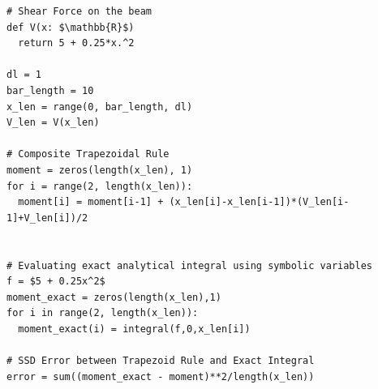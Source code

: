 \documentclass[border=10pt]{standalone}
\begin{document}
\begin{lstlisting}
# Shear Force on the beam
def V(x: $\mathbb{R}$)
  return 5 + 0.25*x.^2 

dl = 1
bar_length = 10
x_len = range(0, bar_length, dl)
V_len = V(x_len)

# Composite Trapezoidal Rule
moment = zeros(length(x_len), 1)
for i = range(2, length(x_len)):
  moment[i] = moment[i-1] + (x_len[i]-x_len[i-1])*(V_len[i-1]+V_len[i])/2


# Evaluating exact analytical integral using symbolic variables
f = $5 + 0.25x^2$
moment_exact = zeros(length(x_len),1)
for i in range(2, length(x_len)):
  moment_exact(i) = integral(f,0,x_len[i])

# SSD Error between Trapezoid Rule and Exact Integral
error = sum((moment_exact - moment)**2/length(x_len))
\end{lstlisting}
\end{document}
